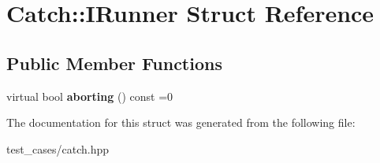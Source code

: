 \hypertarget{structCatch_1_1IRunner}{}\section{Catch\+:\+:I\+Runner Struct Reference}
\label{structCatch_1_1IRunner}
\subsection*{Public Member Functions}
\begin{DoxyCompactItemize}
\item 
\mbox{\label{structCatch_1_1IRunner_a03713202dd2e041e30b8030088ab0116}} 
virtual bool {\bfseries aborting} () const =0
\end{DoxyCompactItemize}


The documentation for this struct was generated from the following file\+:\begin{DoxyCompactItemize}
\item 
test\+\_\+cases/catch.\+hpp\end{DoxyCompactItemize}
